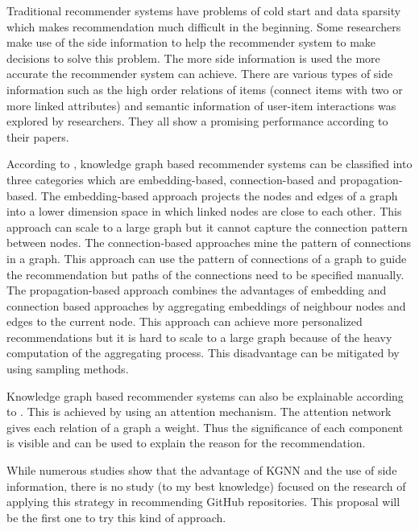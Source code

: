 \documentclass[11pt,twoside]{report}
\begin{document}
Traditional recommender systems have problems of cold start and data sparsity \cite{mansur_review_nodate, wu_graph_2020, zhang_knowledge_2020} which makes recommendation much difficult in the beginning. Some researchers make use of the side information to help the recommender system to make decisions to solve this problem. The more side information is used the more accurate the recommender system can achieve. There are various types of side information such as the high order relations of items (connect items with two or more linked attributes) \cite{wang_kgat_2019} and semantic information of user-item interactions \cite{wang_knowledge_2019} was explored by researchers. They all show a promising performance according to their papers.

According to \cite{guo_survey_2020}, knowledge graph based recommender systems can be classified into three categories which are embedding-based, connection-based and propagation-based. The embedding-based approach projects the nodes and edges of a graph into a lower dimension space in which linked nodes are close to each other. This approach can scale to a large graph but it cannot capture the connection pattern between nodes. The connection-based approaches mine the pattern of connections in a graph. This approach can use the pattern of connections of a graph to guide the recommendation but paths of the connections need to be specified manually. The propagation-based approach combines the advantages of embedding and connection based approaches by aggregating embeddings of neighbour nodes and edges to the current node. This approach can achieve more personalized recommendations but it is hard to scale to a large graph because of the heavy computation of the aggregating process. This disadvantage can be mitigated by using sampling methods.

Knowledge graph based recommender systems can also be explainable according to \cite{guo_survey_2020}. This is achieved by using an attention mechanism. The attention network gives each relation of a graph a weight. Thus the significance of each component is visible and can be used to explain the reason for the recommendation.

While numerous studies show that the advantage of KGNN and the use of side information, there is no study (to my best knowledge) focused on the research of applying this strategy in recommending GitHub repositories. This proposal will be the first one to try this kind of approach.

\end{document}
